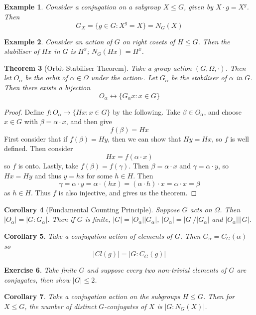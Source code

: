\documentclass[a4paper,10pt]{article}
\newtheorem{thm}{Theorem}
\newtheorem{Cor}[thm]{Corollary}
\newtheorem{eg}[thm]{Example}
\newtheorem{Ex}[thm]{Exercise}
\begin{document}
\begin{eg}
Consider a conjugation on a subgroup $X \leq G$, given by $X \cdot g = X^g$. Then
\[ G_X = \{ g \in G : X^g = X \} = N_G(X) \]
\end{eg}

\begin{eg}
Consider an action of $G$ on right cosets of $H \leq G$. Then the stabiliser of $Hx$ in $G$ is $H^x$; $N_G(Hx) = H^x$. 
\end{eg}


\begin{thm}[Orbit Stabiliser Theorem]
Take a group action $(G, \Omega, \cdot)$. Then let $O_\alpha$ be the orbit of $\alpha \in \Omega$ under the action$\cdot$. Let $G_\alpha$ be the stabiliser of $\alpha$ in $G$. Then there exists a bijection
\[ O_\alpha \leftrightarrow \{ G_\alpha x : x \in G \} \] 
\end{thm}

\begin{proof}
Define $f : O_\alpha \rightarrow \{ Hx : x \in G \}$ by the following. Take $\beta \in O_\alpha$, and choose $x \in G$ with $\beta = \alpha \cdot x$, and then give
\[ f(\beta) = Hx \]
First consider that if $f(\beta) = Hy$, then we can show that $Hy = Hx$, so $f$ is well defined. Then consider 
\[ Hx = f(\alpha \cdot x) \]
so $f$ is onto. Lastly, take $f(\beta) = f(\gamma)$. Then $\beta = \alpha \cdot x$ and $\gamma = \alpha \cdot y$, so $Hx = Hy$ and thus $y = hx$ for some $h \in H$. Then
\[ \gamma = \alpha \cdot y = \alpha \cdot (hx) = (\alpha \cdot h) \cdot x = \alpha \cdot x = \beta \]
as $h \in H$. Thus $f$ is also injective, and gives us the theorem.
\end{proof}

\begin{Cor}[Fundamental Counting Principle]
Suppose $G$ acts on $\Omega$. Then $| O_\alpha | = |G : G_\alpha|$. Then if $G$ is finite, $|G| = |O_\alpha| | G_\alpha| $,  $|O_\alpha| = |G| / |G_\alpha|$ and $|O_\alpha| \big| |G|$. 
\end{Cor}


\begin{Cor}
Take a conjugation action of elements of $G$. Then $G_\alpha =C_G(\alpha)$ so
\[ |Cl(g) |= |G : C_G(g)| \]
\end{Cor}
\begin{Ex}
Take finite $G$ and suppose every two non-trivial elements of $G$ are conjugates, then show $|G| \leq 2$. 
\end{Ex}

\begin{Cor}
Take a conjugation action on the subgroups $H \leq G$. Then for $X \leq G$, the number of distinct $G$-conjugates of $X$ is $|G : N_G(X)|$. 
\end{Cor}
\end{document}
